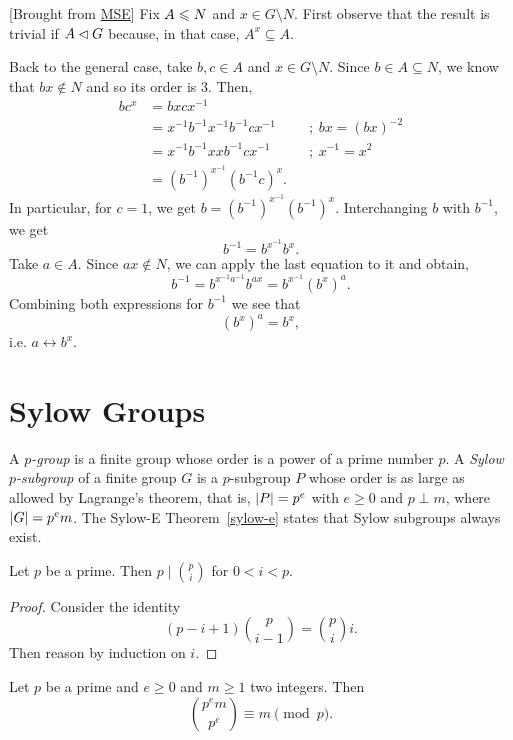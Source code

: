 \begin{solution} {[Brought from \href{https://math.stackexchange.com/a/1485048/269050}{MSE}]} Fix $A\leqslant N$ and $x\in G\setminus N$. First observe that the result is trivial if $A\lhd G$ because, in that case, $A^x\subseteq A$.

Back to the general case, take $b,c\in A$ and $x\in G\setminus N$. Since $b\in A\subseteq N$, we know that $bx\notin N$ and so its order is $3$. Then,
\begin{align*}
    bc^x &= bxcx^{-1}\\
        &= x^{-1}b^{-1}x^{-1}b^{-1}cx^{-1}  &&;\ bx=(bx)^{-2}\\
        &= x^{-1}b^{-1}xxb^{-1}cx^{-1}      &&;\ x^{-1}=x^2\\
        &= (b^{-1})^{x^{-1}}(b^{-1}c)^x.
\end{align*}
In particular, for $c=1$, we get $b=(b^{-1})^{x^{-1}}(b^{-1})^x$. Interchanging $b$ with $b^{-1}$, we get
$$
    b^{-1} = b^{x^{-1}}b^x.
$$
Take $a\in A$. Since $ax\notin N$, we can apply the last equation to it and obtain,
$$
    b^{-1} = b^{x^{-1}a^{-1}}b^{ax} = b^{x^{-1}}(b^x)^a.
$$
Combining both expressions for $b^{-1}$ we see that
$$
    (b^x)^a=b^x,
$$
i.e. $a\leftrightarrow b^x$.  \end{solution}

\section{Sylow Groups}

\begin{defns}
    A \textsl{$p$-group} is a finite group whose order is a power of a prime number $p$. A \textsl{Sylow $p$-subgroup} of a finite group $G$ is a $p$-subgroup $P$ whose order is as large as allowed by Lagrange's theorem, that is, $\left\vert{P}\right\vert=p^e$ with $e\ge0$ and $p\perp m$, where $\left\vert{G}\right\vert = p^em$. The\/ \textrm{\upshape Sylow-E Theorem~\ref{sylow-e}} states that Sylow subgroups always exist.
\end{defns}

\begin{lem}
    Let $p$ be a prime. Then $p\mid\binom pi$ for $0<i<p$.
\end{lem}

\begin{proof} Consider the identity
$$
    (p-i+1)\binom p{i-1}=\binom pii.
$$
Then reason by induction on $i$.  \end{proof}

\begin{prop}
    Let $p$ be a prime and $e\ge0$ and $m\ge1$ two integers. Then
    $$
        \binom{p^em}{p^e} \equiv m\pmod p.
    $$
\end{prop}

